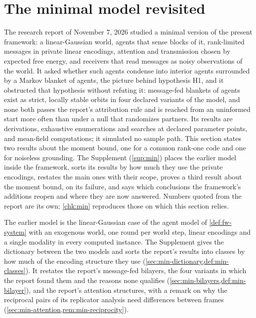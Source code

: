 \section{The minimal model revisited}\label{sec:min}

The research report of November 7, 2026 \citep{dennis2026communicating} studied a minimal version of the present framework: a linear-Gaussian world, agents that sense blocks of it, rank-limited messages in private linear encodings, attention and transmission chosen by expected free energy, and receivers that read messages as noisy observations of the world. It asked whether such agents condense into interior agents surrounded by a Markov blanket of agents, the picture behind hypothesis H1, and it obstructed that hypothesis without refuting it: message-fed blankets of agents exist as strict, locally stable orbits in four declared variants of the model, and none both passes the report's attribution rule and is reached from an uninformed start more often than under a null that randomizes partners. Its results are derivations, exhaustive enumerations and searches at declared parameter points, and mean-field computations; it simulated no sample path. This section states two results about the moment bound, one for a common rank-one code and one for noiseless grounding. The Supplement (\cref{sup:min}) places the earlier model inside the framework, sorts its results by how much they use the private encodings, restates the main ones with their scope, proves a third result about the moment bound, on its failure, and says which conclusions the framework's additions reopen and where they are now answered. Numbers quoted from the report are its own; \cref{chk:min} reproduces those on which this section relies.

The earlier model is the linear-Gaussian case of the agent model of \cref{def:fw-system} with an exogenous world, one round per world step, linear encodings and a single modality in every computed instance. The Supplement gives the dictionary between the two models and sorts the report's results into classes by how much of the encoding structure they use (\cref{sec:min-dictionary,def:min-classes}). It restates the report's message-fed bilayers, the four variants in which the report found them and the reasons none qualifies (\cref{sec:min-bilayers,def:min-bilayer}), and the report's attention structures, with a remark on why the reciprocal pairs of its replicator analysis need differences between frames (\cref{sec:min-attention,rem:min-reciprocity}).

